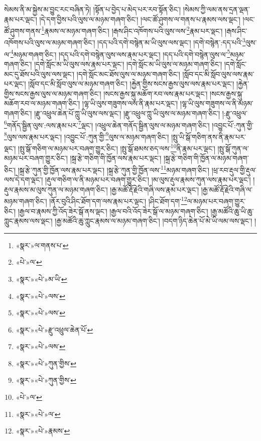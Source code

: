 སེམས་ནི་མ་སྐྱེས་མ་བྱུང་རང་བཞིན་ཏེ། །སྟོན་པ་བྱེད་པ་མེད་པར་རབ་སྟོན་ཅིང་། །སེམས་ཀྱི་ལམ་ནས་དྲན་ལྡན་རྣམ་པར་ལྡང་། །དེ་དག་བྱིས་པའི་ལུས་ལ་མཉམ་གཞག་ཅིང་། །ལང་ཚོ་ཤུགས་ལ་གནས་པ་རྣམས་ལས་ལྡང་། །ལང་ཚོ་ཤུགས་གནས་\footnote{«སྣར་»ལ་གནས་པ་}རྣམས་ལ་མཉམ་གཞག་ཅིང་། །རྒས་ཤིང་འཁོགས་པའི་ལུས་ལས་\footnote{«པེ་»ལ་}རྣམ་པར་ལྡང་། །རྒས་ཤིང་འཁོགས་པའི་ལུས་ལ་མཉམ་གཞག་ཅིང་། །དད་པའི་དགེ་བསྙེན་མ་ཡི་ལུས་ལས་ལྡང་། །དགེ་བསྙེན་:དད་པའི་\footnote{«སྣར་»«པེ་»མ་ཡི་}ལུས་ལ་\footnote{«སྣར་»«པེ་»ལས་}མཉམ་གཞག་ཅིང་། །དད་པའི་དགེ་བསྙེན་ལུས་ལས་རྣམ་པར་ལྡང་། །དད་པའི་དགེ་བསྙེན་ལུས་ལ་\footnote{«སྣར་»«པེ་»ལས་}མཉམ་གཞག་ཅིང་། །དགེ་སློང་མ་ཡི་ལུས་ལས་རྣམ་པར་ལྡང་། །དགེ་སློང་མ་ཡི་ལུས་ལ་མཉམ་གཞག་ཅིང་། །དགེ་སློང་མང་དུ་ཐོས་པའི་ལུས་ལས་ལྡང་། །དགེ་སློང་མང་ཐོས་ལུས་ལ་མཉམ་གཞག་ཅིང་། །སློབ་དང་མི་སློབ་ལུས་ལས་རྣམ་པར་ལྡང་། །སློབ་དང་མི་སློབ་ལུས་ལ་མཉམ་གཞག་ཅིང་། །རྐྱེན་གྱིས་སངས་རྒྱས་ལུས་ལས་རྣམ་པར་ལྡང་། །རྐྱེན་གྱིས་སངས་རྒྱས་ལུས་ལ་མཉམ་གཞག་ཅིང་། །སངས་རྒྱས་སྐུ་མཆོག་རབ་ལས་རྣམ་པར་ལྡང་། །སངས་རྒྱས་སྐུ་མཆོག་རབ་ལ་མཉམ་གཞག་ཅིང་། །ལྷ་ཡི་ལུས་གཟུགས་ལས་ནི་རྣམ་པར་ལྡང་། །ལྷ་ཡི་ལུས་གཟུགས་ལ་ནི་མཉམ་གཞག་ཅིང་། །རྫུ་འཕྲུལ་ཆེན་པོ་ཀླུ་ཡི་ལུས་ལས་ལྡང་། །རྫུ་འཕྲུལ་ཀླུ་ཡི་ལུས་ལ་མཉམ་གཞག་ཅིང་། །:རྫུ་འཕྲུལ་\footnote{«སྣར་»«པེ་»རྫུ་འཕྲུལ་ཆེན་པོ་}གནོད་སྦྱིན་ལུས་:ལས་རྣམ་པར་\footnote{«སྣར་»«པེ་»ལས་}ལྡང་། །འཕྲུལ་ཆེན་གནོད་སྦྱིན་ལུས་ལ་མཉམ་གཞག་ཅིང་། །འབྱུང་པོ་:ཀུན་གྱི་\footnote{«སྣར་»«པེ་»ཀུན་གྱིས་}ལུས་ལས་རྣམ་པར་ལྡང་། །འབྱུང་པོ་:ཀུན་གྱི་\footnote{«སྣར་»«པེ་»ཀུན་གྱིས་}ལུས་ལ་མཉམ་གཞག་ཅིང་། །སྤུ་ཡི་སྒོ་གཅིག་ནས་ནི་རྣམ་པར་ལྡང་། །སྤུ་སྒོ་གཅིག་ལ་མཉམ་པར་བཞག་གྱུར་ཅིང་། །སྤུ་སྒོ་ཐམས་ཅད་ལས་\footnote{«པེ་»ལ་}ནི་རྣམ་པར་ལྡང་། །སྤུ་སྒོ་ཀུན་ལ་མཉམ་པར་བཞག་གྱུར་ཅིང་། །སྐྲ་རྩེ་གཅིག་གི་ཁྱོན་ལས་རྣམ་པར་ལྡང་། །སྐྲ་རྩེ་གཅིག་གི་ཁྱོན་ལ་མཉམ་གཞག་ཅིང་། །སྐྲ་རྩེ་ཀུན་གྱི་ཁྱོན་ལས་རྣམ་པར་ལྡང་། །སྐྲ་རྩེ་ཀུན་གྱི་ཁྱོན་ལས་\footnote{«སྣར་»«པེ་»ལ་}མཉམ་གཞག་ཅིང་། །ཕྲ་རབ་རྡུལ་གྱི་རྡུལ་ལས་དེ་དག་ལྡང་། །རྡུལ་གཅིག་ལ་ནི་མཉམ་པར་བཞག་གྱུར་ཅིང་། །མ་ལུས་རྡུལ་རྣམས་ཀུན་ལས་རྣམ་པར་ལྡང་། །རྡུལ་རྣམས་མ་ལུས་ཀུན་ལ་མཉམ་གཞག་ཅིང་། །རྒྱ་མཚོ་རྡོ་རྗེའི་གཞི་ལས་རྣམ་པར་ལྡང་། །རྒྱ་མཚོ་རྡོ་རྗེའི་གཞི་ལ་མཉམ་གཞག་ཅིང་། །ནོར་བུའི་ཤིང་ཐོག་དག་ལས་རྣམ་པར་ལྡང་། །ཤིང་ཐོག་དག་\footnote{«སྣར་»«པེ་»རྣམས་}ལ་མཉམ་པར་བཞག་གྱུར་ཅིང་། །རྒྱལ་བ་རྣམས་ཀྱི་འོད་ཟེར་སྒོ་ནས་ལྡང་། །རྒྱལ་བའི་འོད་ཟེར་སྒོ་ལ་མཉམ་གཞག་ཅིང་། །རྒྱ་མཚོའི་ཆུ་ཡི་ཆུ་ཀླུང་རྣམས་ལས་ལྡང་། །རྒྱ་མཚོའི་ཆུ་ཀླུང་རྣམས་ལ་མཉམ་གཞག་ཅིང་། །བདག་ཉིད་ཆེན་པོ་མེ་ཡི་ལམ་ལས་ལྡང་། །
